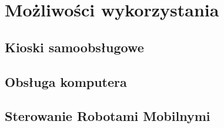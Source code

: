 \chapter{Możliwości wykorzystania}
\section{Kioski samoobsługowe}
\section{Obsługa komputera}
\section{Sterowanie Robotami Mobilnymi}